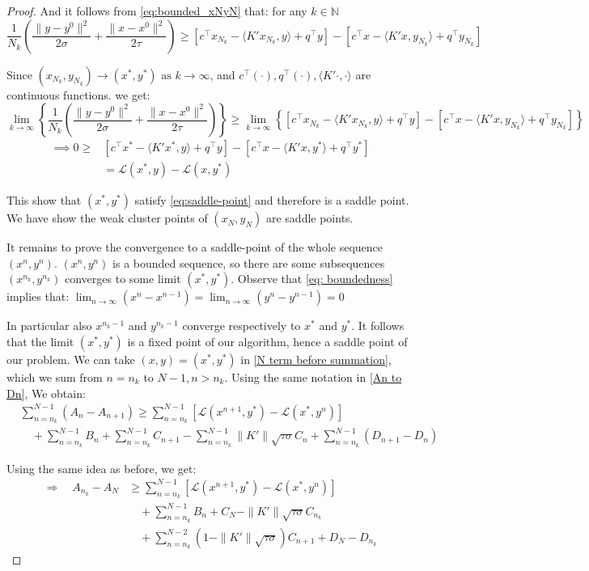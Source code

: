 \documentclass[10pt,a4paper]{amsart}
\begin{document}
\begin{proof}
And it follows from \eqref{eq:bounded_xNyN} that: for any \(k \in \mathbb{N}\)
\[
\frac{1}{{N_k}}(\frac{\|y - y^{0}\|^2}{2\sigma} + \frac{\|x - x^0\|^2}{2\tau}) \ge  [c^\top x_{N_k} - \langle K'x_{N_k}, y \rangle + q^\top y] - [c^\top x - \langle K'x, y_{N_k} \rangle + q^\top y_{N_k} ]
\]

Since \((x_{N_k},y_{N_k}) \to (x^*,y^*) \text{ as }k\to \infty \), and \(c^\top (\cdot), q^\top (\cdot),  \langle K'\cdot, \cdot \rangle \) are continuous functions. we get:
\[
\lim_{k\to \infty}\left\{ \frac{1}{{N_k}}(\frac{\|y - y^{0}\|^2}{2\sigma} + \frac{\|x - x^0\|^2}{2\tau}) \right \} \ge  \lim_{k\to \infty}\left\{ [c^\top x_{N_k} - \langle K'x_{N_k}, y \rangle + q^\top y] - [c^\top x - \langle K'x, y_{N_k} \rangle + q^\top y_{N_k} ] \right \}
\]
\[
\begin{aligned}
    \implies 0\ge& [c^\top x^* - \langle K'x^*, y \rangle + q^\top y] - [c^\top x - \langle K'x, y^* \rangle + q^\top y^* ]\\
    &= \mathcal{L}(x^*,y) - \mathcal{L}(x,y^*)
\end{aligned}
\]

This show that \((x^*,y^*)\) satisfy \eqref{eq:saddle-point} and therefore is a saddle point. We have show the weak cluster points of \((x_N,y_N)\) are saddle points.

It remains to prove the convergence to a saddle-point of the whole sequence \((x^n,y^n)\).  \((x^n,y^n)\) is a bounded sequence, so there are some subsequences \((x^{n_k},y^{n_k})\) converges to some limit \((x^*,y^*)\). Observe that \eqref{eq: boundedness} implies that: \(\lim_{n \to \infty} (x^n-x^{n-1}) = \lim_{n \to \infty} (y^n-y^{n-1}) = 0\)

In particular also \(x^{n_k-1}\) and \(y^{n_k-1}\) converge respectively to \(x^*\) and \(y^*\). It follows that the limit \((x^*,y^*)\) is a fixed point of our algorithm, hence a saddle point of our problem. We can take \((x,y) =(x^*,y^*)\) in \eqref{N term before summation}, which we sum from \(n=n_k\) to \(N-1, n>n_k\). Using the same notation in \eqref{An to Dn}, We obtain:
\begin{align*}
&\sum_{n=n_k}^{N-1}(A_n - A_{n+1}) \ge 
\sum_{n=n_k}^{N-1} \left[ \mathcal{L}(x^{n+1},y^*)- \mathcal{L}(x^*,y^n) \right] \\
&\quad + \sum_{n=n_k}^{N-1} B_n + \sum_{n=n_k}^{N-1} C_{n+1} - \sum_{n=n_k}^{N-1} \|K'\|\sqrt{\tau\sigma}  C_n + \sum_{n=n_k}^{N-1} (D_{n+1} - D_n)
\end{align*}

Using the same idea as before, we get:
\begin{align*}
\Rightarrow\quad
A_{n_k} - A_N &\ge 
\sum_{n=n_k}^{N-1} \left[ \mathcal{L}(x^{n+1},y^*)- \mathcal{L}(x^*,y^n) \right] \\
&\quad + \sum_{n=n_k}^{N-1} B_n + C_N - \|K'\|\sqrt{\tau\sigma}  C_{n_k} \\
&\quad + \sum_{n=n_k}^{N-2} (1 - \|K'\|\sqrt{\tau\sigma})  C_{n+1} + D_N - D_{n_k}
\end{align*}


\end{proof}
\end{document}
